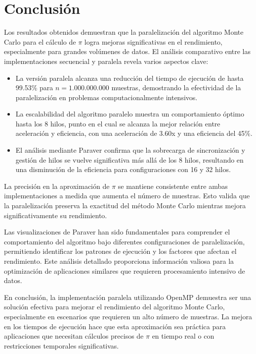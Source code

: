 \documentclass[a4paper, 10pt, onecolumn]{IEEEtran}
\begin{document}
\section{Conclusión}
Los resultados obtenidos demuestran que la paralelización del algoritmo Monte Carlo para el cálculo de $\pi$ logra mejoras significativas en el rendimiento, especialmente para grandes volúmenes de datos. El análisis comparativo entre las implementaciones secuencial y paralela revela varios aspectos clave:

\begin{itemize}
  \item La versión paralela alcanza una reducción del tiempo de ejecución de hasta 99.53\% para $n = 1.000.000.000$ muestras, demostrando la efectividad de la paralelización en problemas computacionalmente intensivos.
  
  \item La escalabilidad del algoritmo paralelo muestra un comportamiento óptimo hasta los 8 hilos, punto en el cual se alcanza la mejor relación entre aceleración y eficiencia, con una aceleración de 3.60x y una eficiencia del 45\%.
  
  \item El análisis mediante Paraver confirma que la sobrecarga de sincronización y gestión de hilos se vuelve significativa más allá de los 8 hilos, resultando en una disminución de la eficiencia para configuraciones con 16 y 32 hilos.
\end{itemize}

La precisión en la aproximación de $\pi$ se mantiene consistente entre ambas implementaciones a medida que aumenta el número de muestras. Esto valida que la paralelización preserva la exactitud del método Monte Carlo mientras mejora significativamente su rendimiento.

Las visualizaciones de Paraver han sido fundamentales para comprender el comportamiento del algoritmo bajo diferentes configuraciones de paralelización, permitiendo identificar los patrones de ejecución y los factores que afectan el rendimiento. Este análisis detallado proporciona información valiosa para la optimización de aplicaciones similares que requieren procesamiento intensivo de datos.

En conclusión, la implementación paralela utilizando OpenMP demuestra ser una solución efectiva para mejorar el rendimiento del algoritmo Monte Carlo, especialmente en escenarios que requieren un alto número de muestras. La mejora en los tiempos de ejecución hace que esta aproximación sea práctica para aplicaciones que necesitan cálculos precisos de $\pi$ en tiempo real o con restricciones temporales significativas.
\end{document}
